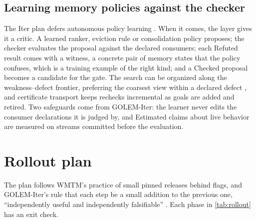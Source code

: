 \documentclass[11pt]{article}
\theoremstyle{definition}
\theoremstyle{plain}
\begin{document}
\subsection{Learning memory policies against the checker}\label{sec:learning}

The Iter plan defers autonomous policy learning \cite{itermem}. When it comes, the layer gives it a
critic. A learned ranker, eviction rule or consolidation policy proposes; the checker evaluates the
proposal against the declared consumers; each Refuted result comes with a witness, a concrete pair
of memory states that the policy confuses, which is a training example of the right kind;
and a Checked proposal becomes a candidate for the gate. The search can be organized along the
weakness--defect frontier, preferring the coarsest view within a declared defect
\cite[Section~4.7]{spec}, and certificate transport keeps rechecks incremental as goals are added and
retired. Two safeguards come from GOLEM-Iter: the learner never edits the consumer declarations it
is judged by, and Estimated claims about live behavior are measured on streams committed before the
evaluation.

\section{Rollout plan}\label{sec:rollout}

The plan follows WMTM's practice of small pinned releases behind flags, and GOLEM-Iter's rule that
each step be a small addition to the previous one, ``independently useful and independently
falsifiable'' \cite{golemspec}. Each phase in \cref{tab:rollout} has an exit check.
\end{document}
